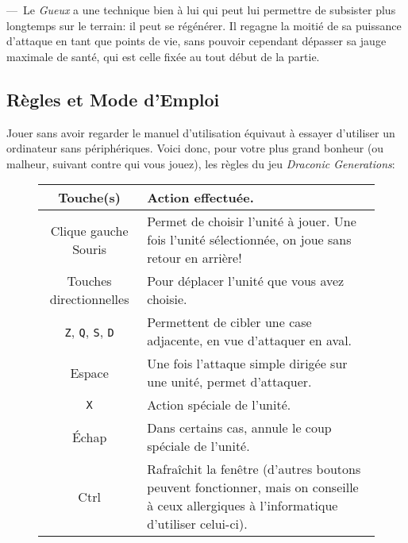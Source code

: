 \documentclass[11pt, a4paper, oneside, portrait]{article}
\begin{document}
            ---~Le \emph{Gueux} a une technique bien à lui qui peut lui permettre de subsister plus longtemps sur le terrain: il peut se régénérer.
            Il regagne la moitié de sa puissance d'attaque en tant que points de vie, sans pouvoir cependant dépasser sa jauge maximale de santé, qui est celle fixée au tout début de la partie.

        \subsection*{Règles et Mode d'Emploi}
            Jouer sans avoir regarder le manuel d'utilisation équivaut à essayer d'utiliser un ordinateur sans périphériques.
            Voici donc, pour votre plus grand bonheur (ou malheur, suivant contre qui vous jouez), les règles du jeu \emph{Draconic Generations}:
            \begin{figure}[H]
                \centering
                \begin{tabularx}{0.75\textwidth}{|c|X|}
                    \hline
                    Touche(s) & Action effectuée.\\
                    \hline
                    Clique gauche Souris & Permet de choisir l'unité à jouer. Une fois l'unité sélectionnée, on joue sans retour en arrière!\\
                    \hline
                    Touches directionnelles & Pour déplacer l'unité que vous avez choisie.\\
                    \hline
                    \texttt{Z}, \texttt{Q}, \texttt{S}, \texttt{D} & Permettent de cibler une case adjacente, en vue d'attaquer en aval.\\
                    \hline
                    Espace & Une fois l'attaque simple dirigée sur une unité, permet d'attaquer.\\
                    \hline
                    \texttt{X} & Action spéciale de l'unité.\\
                    \hline
                    Échap & Dans certains cas, annule le coup spéciale de l'unité.\\
                    \hline
                    Ctrl & Rafraîchit la fenêtre (d'autres boutons peuvent fonctionner, mais on conseille à ceux allergiques à l'informatique d'utiliser celui-ci).\\
                    \hline
                \end{tabularx}
            \end{figure}
\end{document}
